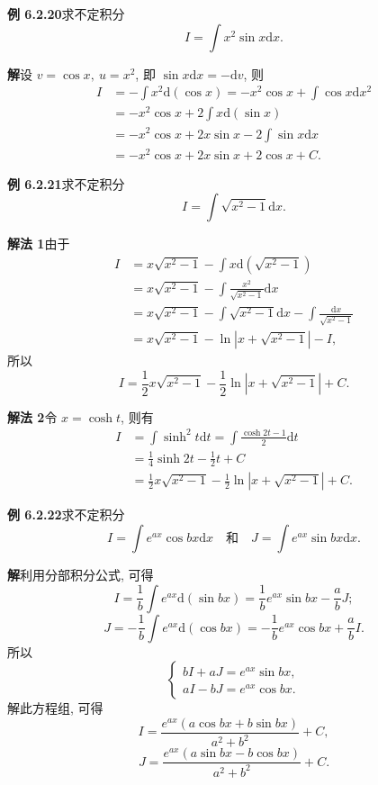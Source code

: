 \documentclass[UTF8,12pt,a4paper,fontset=fandol]{ctexart}
\begin{document}
\noindent\textbf{例 6.2.20}\quad 求不定积分
\[
  I=\int x^2\sin x\mathrm dx.
\]

\noindent\textbf{解}\quad 设 $v=\cos x,\ u=x^2$, 即 $\sin x\mathrm dx=-\mathrm dv$, 则
\[
\begin{aligned}
  I
  &=
  -\int x^2\mathrm d(\cos x)
  =
  -x^2\cos x+\int\cos x\mathrm d x^2\\
  &=
  -x^2\cos x+2\int x\mathrm d(\sin x)\\
  &=
  -x^2\cos x+2x\sin x-2\int\sin x\mathrm dx\\
  &=
  -x^2\cos x+2x\sin x+2\cos x+C.
\end{aligned}
\]

\noindent\textbf{例 6.2.21}\quad 求不定积分
\[
  I=\int\sqrt{x^2-1}\mathrm dx.
\]

\noindent\textbf{解法 1}\quad 由于
\[
\begin{aligned}
  I
  &=
  x\sqrt{x^2-1}-\int x\mathrm d(\sqrt{x^2-1})\\
  &=
  x\sqrt{x^2-1}-\int\frac{x^2}{\sqrt{x^2-1}}\mathrm dx\\
  &=
  x\sqrt{x^2-1}-\int\sqrt{x^2-1}\mathrm dx-\int\frac{\mathrm dx}{\sqrt{x^2-1}}\\
  &=
  x\sqrt{x^2-1}-\ln|x+\sqrt{x^2-1}|-I,
\end{aligned}
\]
所以
\[
  I=\frac12x\sqrt{x^2-1}-\frac12\ln|x+\sqrt{x^2-1}|+C.
\]

\noindent\textbf{解法 2}\quad 令 $x=\cosh t$, 则有
\[
\begin{aligned}
  I
  &=
  \int\sinh^2t\mathrm dt
  =
  \int\frac{\cosh2t-1}{2}\mathrm dt\\
  &=
  \frac14\sinh2t-\frac12t+C\\
  &=
  \frac12x\sqrt{x^2-1}-\frac12\ln|x+\sqrt{x^2-1}|+C.
\end{aligned}
\]

\noindent\textbf{例 6.2.22}\quad 求不定积分
\[
  I=\int e^{ax}\cos bx\mathrm dx
  \quad\text{和}\quad
  J=\int e^{ax}\sin bx\mathrm dx.
\]

\noindent\textbf{解}\quad 利用分部积分公式, 可得
\[
  I=\frac1b\int e^{ax}\mathrm d(\sin bx)
  =
  \frac1be^{ax}\sin bx-\frac abJ;
\]
\[
  J=-\frac1b\int e^{ax}\mathrm d(\cos bx)
  =
  -\frac1be^{ax}\cos bx+\frac abI.
\]
所以
\[
  \begin{cases}
    bI+aJ=e^{ax}\sin bx,\\
    aI-bJ=e^{ax}\cos bx.
  \end{cases}
\]
解此方程组, 可得
\[
  I=\frac{e^{ax}(a\cos bx+b\sin bx)}{a^2+b^2}+C,
\]
\[
  J=\frac{e^{ax}(a\sin bx-b\cos bx)}{a^2+b^2}+C.
\]
\end{document}
